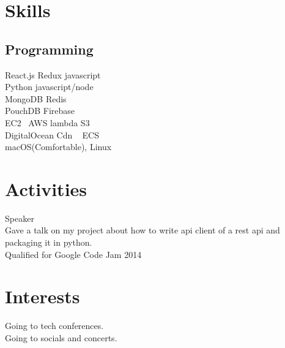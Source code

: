 \documentclass[]{deedy-resume-openfont}
\begin{document}
\begin{minipage}[t]{0.33\textwidth}
\sectionsep





\section{Skills}
\subsection{Programming}
\textbullet{} React.js \textbullet{} Redux \textbullet{} javascript \\
\textbullet{} Python \textbullet{} javascript/node \\
\textbullet{} MongoDB \textbullet{} Redis \\
\textbullet{} PouchDB \textbullet{} Firebase \\
\textbullet{} EC2 \ AWS lambda \textbullet{} S3 \\
\textbullet{} DigitalOcean \textbullet{} Cdn \ \textbullet{} ECS \\
\textbullet{} macOS(Comfortable), Linux \\
\sectionsep

%
%

\section{Activities}
\textbullet{} Speaker \\
\textbullet{} Gave a talk on my project about how to write api client of a rest api and packaging it in python. \\
\textbullet{}  Qualified for Google Code Jam 2014  \\
\sectionsep
%
%

\section{Interests}
\textbullet{} Going to tech conferences. \\
\textbullet{} Going to socials and concerts. \\

%
%

\end{minipage}
\end{document}
